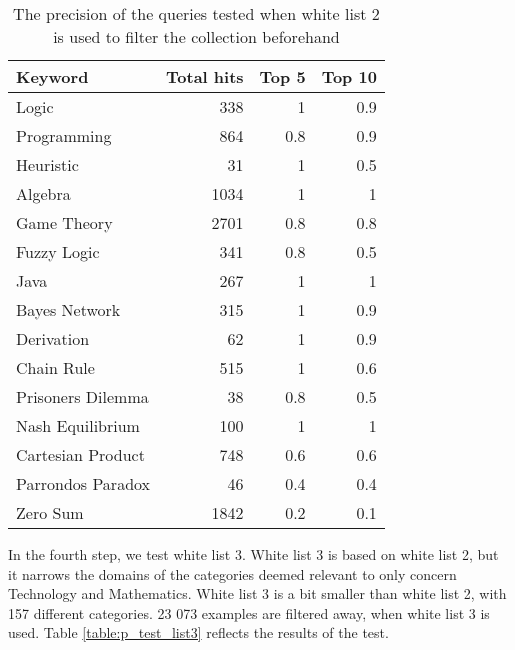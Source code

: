 \begin{table}[H]
\centering
\begin{tabular} {|| p{15em} | r | r | r ||} 
 \hline
 Keyword & Total hits & Top 5 & Top 10 \\ [0.5ex] 
 \hline

Logic & 338 & 1 & 0.9 \\
Programming & 864 & 0.8 & 0.9 \\
Heuristic & 31 & 1 & 0.5 \\
Algebra & 1034 & 1 & 1 \\
Game Theory & 2701 & 0.8 & 0.8 \\
\hline
Fuzzy Logic & 341 & 0.8 & 0.5 \\
Java & 267 & 1 & 1 \\
Bayes Network & 315 & 1 & 0.9 \\
Derivation & 62 & 1 & 0.9 \\
\hline
Chain Rule & 515 & 1 & 0.6 \\
Prisoners Dilemma & 38 & 0.8 & 0.5 \\
Nash Equilibrium & 100 & 1 & 1 \\
Cartesian Product & 748 & 0.6 & 0.6 \\
Parrondos Paradox & 46 & 0.4 & 0.4 \\
Zero Sum & 1842 & 0.2 & 0.1 \\

 \hline
\end{tabular}
\caption{The precision of the queries tested when white list 2 is used to filter the collection beforehand}
\label{table:p_test_list2}
\end{table}

In the fourth step, we test white list 3. White list 3 is based on white list 2, but it narrows the domains of the categories deemed relevant to only concern Technology and Mathematics. White list 3 is a bit smaller than white list 2, with 157 different categories. 23 073 examples are filtered away, when white list 3 is used. Table \ref{table:p_test_list3} reflects the results of the test.

